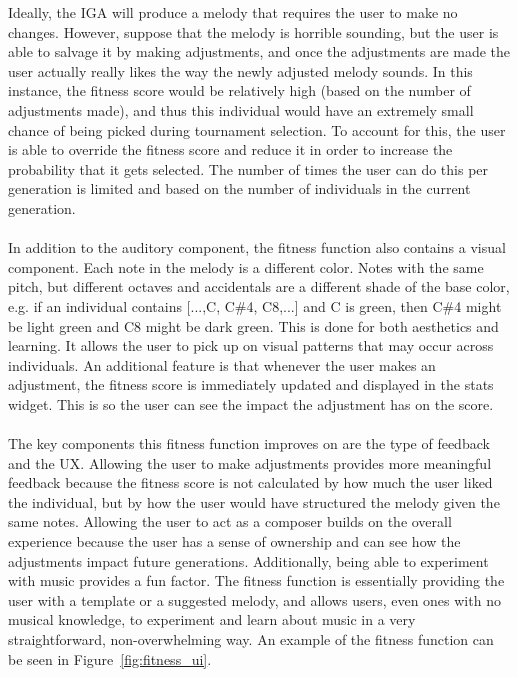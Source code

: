 \documentclass[12pt]{article} %
\begin{document}
Ideally, the IGA will produce a melody that requires the user to make no changes. However, suppose that the melody is horrible sounding, but the user is able to salvage it by making adjustments, and once the adjustments are made the user actually really likes the way the newly adjusted melody sounds. In this instance, the fitness score would be relatively high (based on the number of adjustments made), and thus this individual would have an extremely small chance of being picked during tournament selection. To account for this, the user is able to override the fitness score and reduce it in order to increase the probability that it gets selected. The number of times the user can do this per generation is limited and based on the number of individuals in the current generation. \\
\\
In addition to the auditory component, the fitness function also contains a visual component. Each note in the melody is a different color. Notes with the same pitch, but different octaves and accidentals are a different shade of the base color, e.g. if an individual contains [...,C, C\#4, C8,...] and C is green, then C\#4 might be light green and C8 might be dark green. This is done for both aesthetics and learning. It allows the user to pick up on visual patterns that may occur across individuals. An additional feature is that whenever the user makes an adjustment, the fitness score is immediately updated and displayed in the stats widget. This is so the user can see the impact the adjustment has on the score.\\
\\
The key components this fitness function improves on are the type of feedback and the UX. Allowing the user to make adjustments provides more meaningful feedback because the fitness score is not calculated by how much the user liked the individual, but by how the user would have structured the melody given the same notes. Allowing the user to act as a composer builds on the overall experience because the user has a sense of ownership and can see how the adjustments impact future generations. Additionally, being able to experiment with music provides a fun factor. The fitness function is essentially providing the user with a template or a suggested melody, and allows users, even ones with no musical knowledge, to experiment and learn about music in a very straightforward, non-overwhelming way. An example of the fitness function can be seen in Figure~\ref{fig:fitness_ui}.
\end{document}
